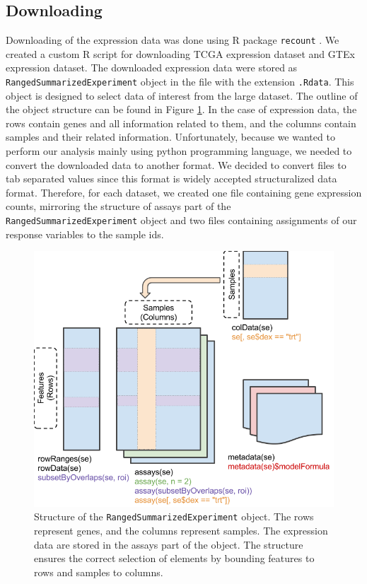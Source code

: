 \subsection{Downloading}
Downloading of the expression data was done using R package \verb'recount' \cite{collado2017reproducible}.
We created a custom R script for downloading TCGA expression dataset and GTEx expression dataset.
The downloaded expression data were stored as \verb'RangedSummarizedExperiment' object in the file with the extension \verb'.Rdata'.
This object is designed to select data of interest from the large dataset.
The outline of the object structure can be found in Figure \ref{fig:sre}.
In the case of expression data, the rows contain genes and all information related to them, and the columns contain samples and their related information.
Unfortunately, because we wanted to perform our analysis mainly using python programming language, we needed to convert the downloaded data to another format.
We decided to convert files to tab separated values since this format is widely accepted structuralized data format.
Therefore, for each dataset, we created one file containing gene expression counts, mirroring the structure of assays part of the \verb'RangedSummarizedExperiment' object and two files containing assignments of our response variables to the sample ids.

\begin{figure}
    \centering
    \includegraphics[width=0.8\linewidth]{images/SummarizedExperiment.png}
    \caption[Structure of \texttt{RangedSummarizedExperiment}]{Structure of the \texttt{RangedSummarizedExperiment} object. The rows represent genes, and the columns represent samples. The expression data are stored in the assays part of the object. The structure ensures the correct selection of elements by bounding features to rows and samples to columns.}
    \label{fig:sre}
\end{figure}

